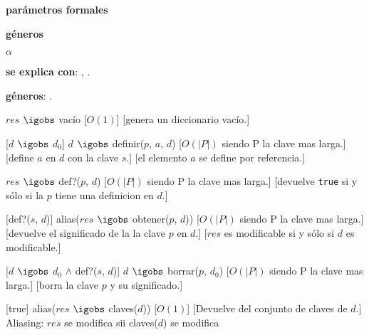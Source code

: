 
\begin{Interfaz}

  \textbf{par\'ametros formales}\parindent\\
  \parbox{1.7cm}{\textbf{g\'eneros}} $\alpha$
 
 
  \textbf{se explica con}: , .

  \textbf{g\'eneros}: .

  {$res$ $\igobs$ vac\'io}
  [$O(1)$]
  [genera un diccionario vac\'io.]

  [$d$ $\igobs$ $d_0$]
  {$d$ $\igobs$ definir($p$, $a$, $d$)}
  [$O(|P|)$ siendo P la clave mas larga.]
  [define $a$ en $d$ con la clave $s$.]
  [el elemento $a$ se define por referencia.]

  {$res$ $\igobs$ def?($p$, $d$)}
  [$O(|P|)$ siendo P la clave mas larga.]
  [devuelve \texttt{true} si y s\'olo si la $p$ tiene una definicion en $d$.]

  [def?($s$, $d$)]
  {alias($res$ $\igobs$ obtener($p$, $d$))}
  [$O(|P|)$ siendo P la clave mas larga.]
  [devuelve el significado de la la clave $p$ en $d$.]
  [$res$ es modificable si y s\'olo si $d$ es modificable.]

  [$d$ $\igobs$ $d_0$ $\land$ def?($s$, $d$)]
  {$d$ $\igobs$ borrar($p$, $d_0$)}
  [$O(|P|)$ siendo P la clave mas larga.]
  [borra la clave $p$ y su significado.]

  [true]
  {alias($res$ $\igobs$ claves($d$))}
  [$O(1)$]
  [Devuelve del conjunto de claves de $d$.]
  {Aliasing: $res$ se modifica sii claves($d$) se modifica}



\end{Interfaz}

\pagebreak


